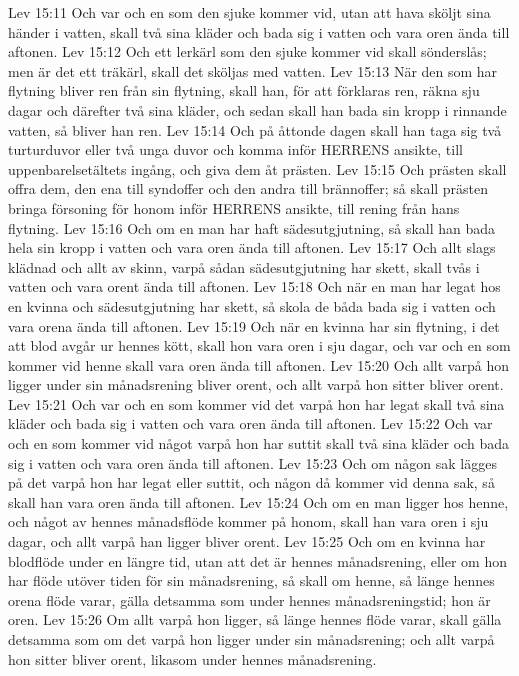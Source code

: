 Lev 15:11  Och var och en som den sjuke kommer vid, utan att hava sköljt sina händer i vatten, skall två sina kläder och bada sig i vatten och vara oren ända till aftonen.
Lev 15:12  Och ett lerkärl som den sjuke kommer vid skall sönderslås; men är det ett träkärl, skall det sköljas med vatten.
Lev 15:13  När den som har flytning bliver ren från sin flytning, skall han, för att förklaras ren, räkna sju dagar och därefter två sina kläder, och sedan skall han bada sin kropp i rinnande vatten, så bliver han ren.
Lev 15:14  Och på åttonde dagen skall han taga sig två turturduvor eller två unga duvor och komma inför HERRENS ansikte, till uppenbarelsetältets ingång, och giva dem åt prästen.
Lev 15:15  Och prästen skall offra dem, den ena till syndoffer och den andra till brännoffer; så skall prästen bringa försoning för honom inför HERRENS ansikte, till rening från hans flytning.
Lev 15:16  Och om en man har haft sädesutgjutning, så skall han bada hela sin kropp i vatten och vara oren ända till aftonen.
Lev 15:17  Och allt slags klädnad och allt av skinn, varpå sådan sädesutgjutning har skett, skall tvås i vatten och vara orent ända till aftonen.
Lev 15:18  Och när en man har legat hos en kvinna och sädesutgjutning har skett, så skola de båda bada sig i vatten och vara orena ända till aftonen.
Lev 15:19  Och när en kvinna har sin flytning, i det att blod avgår ur hennes kött, skall hon vara oren i sju dagar, och var och en som kommer vid henne skall vara oren ända till aftonen.
Lev 15:20  Och allt varpå hon ligger under sin månadsrening bliver orent, och allt varpå hon sitter bliver orent.
Lev 15:21  Och var och en som kommer vid det varpå hon har legat skall två sina kläder och bada sig i vatten och vara oren ända till aftonen.
Lev 15:22  Och var och en som kommer vid något varpå hon har suttit skall två sina kläder och bada sig i vatten och vara oren ända till aftonen.
Lev 15:23  Och om någon sak lägges på det varpå hon har legat eller suttit, och någon då kommer vid denna sak, så skall han vara oren ända till aftonen.
Lev 15:24  Och om en man ligger hos henne, och något av hennes månadsflöde kommer på honom, skall han vara oren i sju dagar, och allt varpå han ligger bliver orent.
Lev 15:25  Och om en kvinna har blodflöde under en längre tid, utan att det är hennes månadsrening, eller om hon har flöde utöver tiden för sin månadsrening, så skall om henne, så länge hennes orena flöde varar, gälla detsamma som under hennes månadsreningstid; hon är oren.
Lev 15:26  Om allt varpå hon ligger, så länge hennes flöde varar, skall gälla detsamma som om det varpå hon ligger under sin månadsrening; och allt varpå hon sitter bliver orent, likasom under hennes månadsrening.
